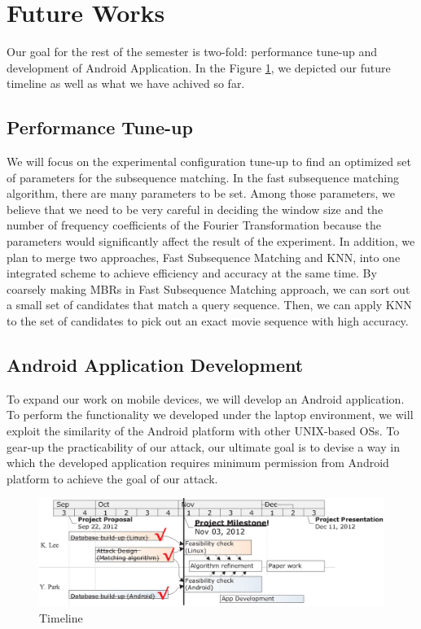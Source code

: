 \section{Future Works}
\label{sec:future}
Our goal for the rest of the semester is two-fold: performance tune-up and development of Android Application. In the Figure \ref{fig:timeline}, we depicted our future timeline as well as what we have achived so far.
\subsection{Performance Tune-up}
We will focus on the experimental configuration tune-up to find an optimized set of parameters for the subsequence matching. In the fast subsequence matching algorithm, there are many parameters to be set. Among those parameters, we believe that we need to be very careful in deciding the window size and the number of frequency coefficients of the Fourier Transformation because the parameters would significantly affect the result of the experiment.
In addition, we plan to merge two approaches, Fast Subsequence Matching and KNN, into one integrated scheme to achieve efficiency and accuracy at the same time. By coarsely making MBRs in Fast Subsequence Matching approach, we can sort out a small set of candidates that match a query sequence. Then, we can apply KNN to the set of candidates to pick out an exact movie sequence with high accuracy.
\subsection{Android Application Development}
To expand our work on mobile devices, we will develop an Android application. To perform the functionality we developed under the laptop environment, we will exploit the similarity of the Android platform with other UNIX-based OSs. To gear-up the practicability of our attack, our ultimate goal is to devise a way in which the developed application requires minimum permission from Android platform to achieve the goal of our attack.
\begin{figure}[!h]
\centering
\includegraphics{Figures/Timeline_Mile}
\caption{Timeline}
\label{fig:timeline}
\vspace{-5mm}
\end{figure}